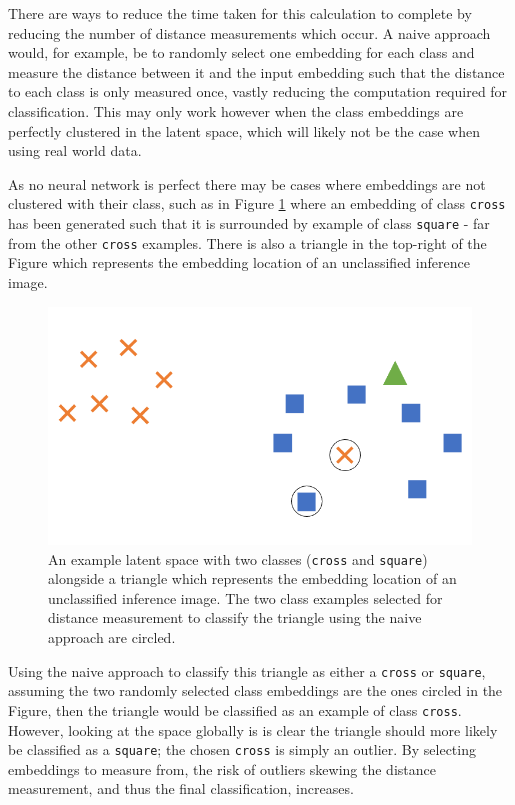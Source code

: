 There are ways to reduce the time taken for this calculation to complete by reducing the number of distance measurements which occur. A naive approach would, for example, be to randomly select one embedding for each class and measure the distance between it and the input embedding such that the distance to each class is only measured once, vastly reducing the computation required for classification. This may only work however when the class embeddings are perfectly clustered in the latent space, which will likely not be the case when using real world data.

As no neural network is perfect there may be cases where embeddings are not clustered with their class, such as in Figure \ref{fig:naive-embedding-example} where an embedding of class \texttt{cross} has been generated such that it is surrounded by example of class \texttt{square} - far from the other \texttt{cross} examples. There is also a triangle in the top-right of the Figure which represents the embedding location of an unclassified inference image. 

 \begin{figure}[h]
	\begin{center}
		\includegraphics[scale=0.5]{Chapter5/figs/naive-embedding-example.png}
	\end{center}
	\caption{An example latent space with two classes (\texttt{cross} and \texttt{square}) alongside a triangle which represents the embedding location of an unclassified inference image. The two class examples selected for distance measurement to classify the triangle using the naive approach are circled.}
	\label{fig:naive-embedding-example}
\end{figure}

Using the naive approach to classify this triangle as either a \texttt{cross} or \texttt{square}, assuming the two randomly selected class embeddings are the ones circled in the Figure, then the triangle would be classified as an example of class \texttt{cross}. However, looking at the space globally is is clear the triangle should more likely be classified as a \texttt{square}; the chosen \texttt{cross} is simply an outlier. By selecting embeddings to measure from, the risk of outliers skewing the distance measurement, and thus the final classification, increases.


